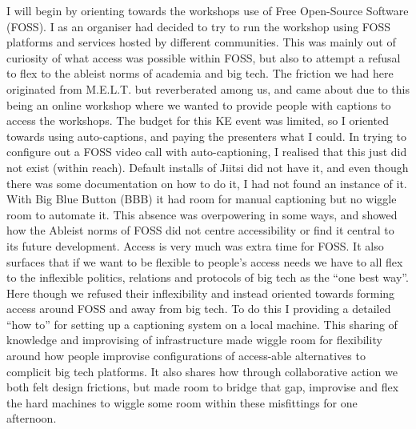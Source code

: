 I will begin by orienting towards the workshops use of Free Open-Source
Software (FOSS). I as an organiser had decided to try to run the
workshop using FOSS platforms and services hosted by different
communities. This was mainly out of curiosity of what access was
possible within FOSS, but also to attempt a refusal to flex to the
ableist norms of academia and big tech. The friction we had here
originated from M.E.L.T. but reverberated among us, and came about due
to this being an online workshop where we wanted to provide people with
captions to access the workshops. The budget for this KE event was
limited, so I oriented towards using auto-captions, and paying the
presenters what I could. In trying to configure out a FOSS video call
with auto-captioning, I realised that this just did not exist (within
reach). Default installs of Jiitsi did not have it, and even though
there was some documentation on how to do it, I had not found an
instance of it. With Big Blue Button (BBB) it had room for manual
captioning but no wiggle room to automate it. This absence was
overpowering in some ways, and showed how the Ableist norms of FOSS did
not centre accessibility or find it central to its future development.
Access is very much was extra time for FOSS. It also surfaces that if we
want to be flexible to people's access needs we have to all flex to the
inflexible politics, relations and protocols of big tech as the ``one
best way''. Here though we refused their inflexibility and instead
oriented towards forming access around FOSS and away from big tech. To
do this I providing a detailed ``how to'' for setting up a captioning
system on a local machine. This sharing of knowledge and improvising of
infrastructure made wiggle room for flexibility around how people
improvise configurations of access-able alternatives to complicit big
tech platforms. It also shares how through collaborative action we both
felt design frictions, but made room to bridge that gap, improvise and
flex the hard machines to wiggle some room within these misfittings for
one afternoon.

